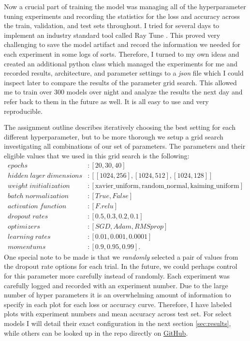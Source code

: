\documentclass[11pt]{amsart}
\begin{document}
Now a crucial part of training the model was managing all of the hyperparameter tuning experiments and recording the statistics for the loss and accuracy across the train, validation, and test sets throughout.
I tried for several days to implement an industry standard tool called Ray Tune \cite{liaw2018tune}.
This proved very challenging to save the model artifact and record the information we needed for each experiment in some logs of sorts.
Therefore, I turned to my own ideas and created an additional python class which managed the experiments for me and recorded results, architecture, and parameter settings to a \textit{json} file which I could inspect later to compare the results of the parameter grid search.
This allowed me to train over 300 models over night and analyze the results the next day and refer back to them in the future as well.
It is all easy to use and very reproducible.

The assignment outline describes iteratively choosing the best setting for each different hyperparameter, but to be more thorough we setup a grid search investigating all combinations of our set of parameters.
The parameters and their eligible values that we used in this grid search is the following:
\begin{align*}
epochs &: [20, 30, 40] \\
hidden \; layer \; dimensions &: [[1024, 256], [1024, 512], [1024, 128]] \\
weight \; initialization &: [\text{xavier\_uniform}, \text{random\_normal}, \text{kaiming\_uniform}] \\
batch \; normalization &: [True, False] \\
activation \; function &: [F.relu] \\
dropout \; rates &: [0.5, 0.3, 0.2, 0.1] \\
optimizers &: [SGD, Adam, RMSprop] \\
learning \; rates &: [0.01, 0.001, 0.0001] \\
momentums &: [0.9, 0.95, 0.99].
\end{align*}
One special note to be made is that we \textit{randomly} selected a pair of values from the dropout rate options for each trial.
In the future, we could perhaps control for this parameter more carefully instead of randomly.
Each experiment was carefully logged and recorded with an experiment number.
Due to the large number of hyper parameters it is an overwhelming amount of information to specify in each plot for each loss or accuracy curve.
Therefore, I have labeled plots with experiment numbers and mean accuracy across test set.
For select models I will detail their exact configuration in the next section \ref{sec:results}, while others can be looked up in the repo directly on \href{https://github.com/hunter-lybbert/uw-central/blob/main/data_analysis/hw_04/experiments/experiments.json}{GitHub}.
\end{document}
